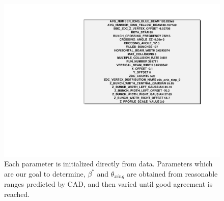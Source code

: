 \begin{figure}
\begin{center}
\includegraphics[width=\linewidth,height=\textheight,keepaspectratio]{./figures/sample_configuration}
\caption{
Each parameter is initialized directly from data. Parameters which are our goal
to determine, $\beta^{*}$ and $\theta_{xing}$ are obtained from reasonable
ranges predicted by CAD, and then varied until good agreement is reached.
}
\label{fig:sample_configuration}
\end{center}
\end{figure}

